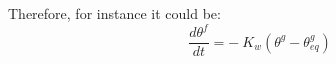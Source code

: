 Therefore, for instance it could be:
\begin{equation}
\frac{d \theta^f}{dt} = - \ K_w ({\theta^g - \theta^g_{eq}})
\end{equation}